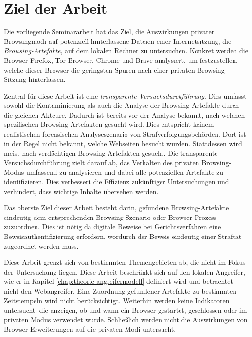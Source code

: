 \chapter{Ziel der Arbeit}
Die vorliegende Seminararbeit hat das Ziel, die Auswirkungen privater Browsingmodi auf potenziell hinterlassene Dateien einer Internetsitzung, die \textit{Browsing-Artefakte}, auf dem lokalen Rechner zu untersuchen. Konkret werden die Browser Firefox, Tor-Browser, Chrome und Brave analysiert, um festzustellen, welche dieser Browser die geringsten Spuren nach einer privaten Browsing-Sitzung hinterlassen.

Zentral für diese Arbeit ist eine \textit{transparente Versuchsdurchführung}. Dies umfasst sowohl die Kontaminierung als auch die Analyse der Browsing-Artefakte durch die gleichen Akteure. Dadurch ist bereits vor der Analyse bekannt, nach welchen spezifischen Browsing-Artefakten gesucht wird. Dies entspricht keinem realistischen forensischen Analyseszenario von Strafverfolgungsbehörden. Dort ist in der Regel nicht bekannt, welche Webseiten besucht wurden. Stattdessen wird meist nach verdächtigen Browsing-Artefakten gesucht.
Die transparente Versuchsdurchführung zielt darauf ab, das Verhalten des privaten Browsing-Modus umfassend zu analysieren und dabei alle potenziellen Artefakte zu identifizieren. Dies verbessert die Effizienz zukünftiger Untersuchungen und verhindert, dass wichtige Inhalte übersehen werden. \cite{Horsman.2019}

Das oberste Ziel dieser Arbeit besteht darin, gefundene Browsing-Artefakte eindeutig dem entsprechenden Browsing-Szenario oder Browser-Prozess zuzuordnen. 
Dies ist nötig da digitale Beweise bei Gerichtsverfahren eine Beweisauthentifizierung erfordern, wordurch der Beweis eindeutig einer Straftat zugeordnet werden muss.

Diese Arbeit grenzt sich von bestimmten Themengebieten ab, die nicht im Fokus der Untersuchung liegen. Diese Arbeit beschränkt sich auf den lokalen Angreifer, wie er in Kapitel \ref{chap:theorie-angreifermodell} definiert wird und betrachtet nicht den Webangreifer. Eine Zuordnung gefundener Artefakte zu bestimmten Zeitstempeln wird nicht berücksichtigt. 
Weiterhin werden keine Indikatoren untersucht, die anzeigen, ob und wann ein Browser gestartet, geschlossen oder im privaten Modus verwendet wurde.
Schließlich werden nicht die Auswirkungen von Browser-Erweiterungen auf die privaten Modi untersucht.

